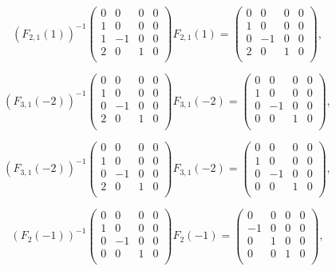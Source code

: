 \documentclass[color=black,device=normal,lang=cn,mode=geye]{elegantnote}
\begin{document}
\begin{solution}
    \[(F_{2,1}(1))^{-1}\begin{pmatrix}
        0 & 0 & 0 & 0 \\
        1 & 0 & 0 & 0 \\
        1 & -1 & 0 & 0 \\
        2 & 0 & 1 & 0 \\
    \end{pmatrix}F_{2,1}(1)=\begin{pmatrix}
        0 & 0 & 0 & 0 \\
        1 & 0 & 0 & 0 \\
        0 & -1 & 0 & 0 \\
        2 & 0 & 1 & 0 \\
    \end{pmatrix},\]

    \[(F_{3,1}(-2))^{-1}\begin{pmatrix}
        0 & 0 & 0 & 0 \\
        1 & 0 & 0 & 0 \\
        0 & -1 & 0 & 0 \\
        2 & 0 & 1 & 0 \\
    \end{pmatrix}F_{3,1}(-2)=\begin{pmatrix}
        0 & 0 & 0 & 0 \\
        1 & 0 & 0 & 0 \\
        0 & -1 & 0 & 0 \\
        0 & 0 & 1 & 0 \\
    \end{pmatrix},\]

    \[(F_{3,1}(-2))^{-1}\begin{pmatrix}
        0 & 0 & 0 & 0 \\
        1 & 0 & 0 & 0 \\
        0 & -1 & 0 & 0 \\
        2 & 0 & 1 & 0 \\
    \end{pmatrix}F_{3,1}(-2)=\begin{pmatrix}
        0 & 0 & 0 & 0 \\
        1 & 0 & 0 & 0 \\
        0 & -1 & 0 & 0 \\
        0 & 0 & 1 & 0 \\
    \end{pmatrix},\]

    \[(F_2(-1))^{-1}\begin{pmatrix}
        0 & 0 & 0 & 0 \\
        1 & 0 & 0 & 0 \\
        0 & -1 & 0 & 0 \\
        0 & 0 & 1 & 0 \\
    \end{pmatrix}F_2(-1)=\begin{pmatrix}
        0 & 0 & 0 & 0 \\
        -1 & 0 & 0 & 0 \\
        0 & 1 & 0 & 0 \\
        0 & 0 & 1 & 0 \\
    \end{pmatrix},\]


\end{solution}
\end{document}
